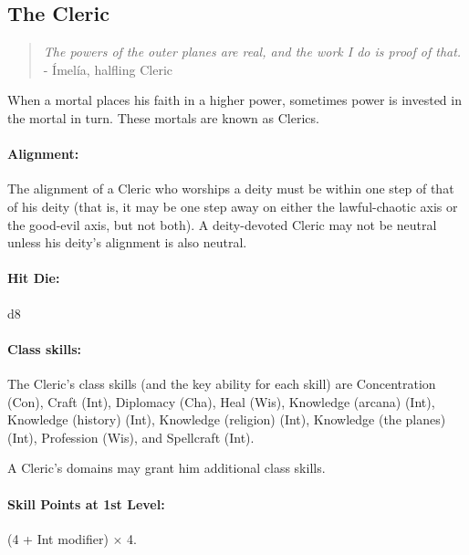 \subsection[Cleric]{The Cleric}
\begin{quote}
\emph{The powers of the outer planes are real, and the work I do is proof of that.}
- \'Imel\'ia, halfling Cleric
\end{quote}
When a mortal places his faith in a higher power, sometimes power is invested in the mortal in turn.
These mortals are known as Clerics.
\paragraph{Alignment:}
The alignment of a Cleric who worships a deity must be within one step of that of his deity  (that is, it may be one step away on either the lawful-chaotic axis or the good-evil axis, but not both). A deity-devoted Cleric may not be neutral unless his deity's alignment is also neutral.
\paragraph{Hit Die:} d8
\paragraph{Class skills:}
The Cleric's class skills (and the key ability for each skill) are 
Concentration (Con), Craft (Int), Diplomacy (Cha), Heal (Wis), Knowledge (arcana) (Int), Knowledge (history) (Int), Knowledge (religion) (Int), Knowledge (the planes) (Int), Profession (Wis), and Spellcraft (Int).

A Cleric's domains may grant him additional class skills.
\paragraph{Skill Points at 1st Level:} (4 + Int modifier) $\times$ 4.
